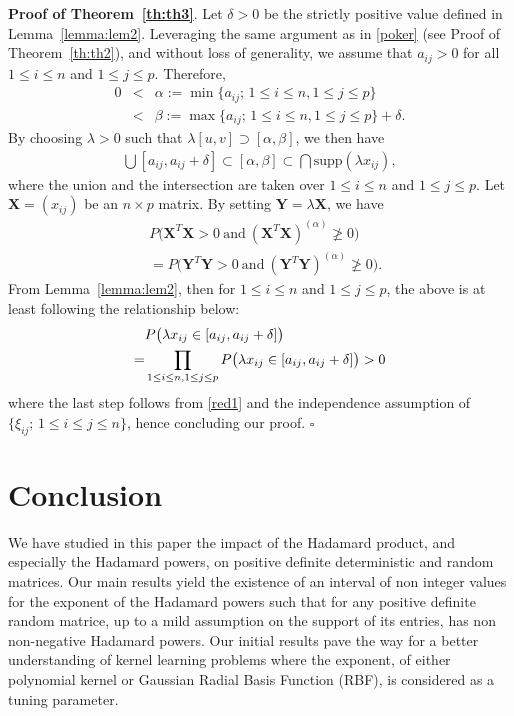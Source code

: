 \documentclass[conference,letterpaper]{IEEEtran}
\numberwithin{equation}{section}
\newcommand{\lbl}{\label}
\newcommand{\beaa}{\begin{eqnarray*}}
\newcommand{\eeaa}{\end{eqnarray*}}
\newcommand{\bea}{\begin{eqnarray}}
\newcommand{\eea}{\end{eqnarray}}
\begin{document}
\noindent\textbf{Proof of Theorem~\ref{th:th3}}. Let $\delta >0$ be the strictly positive value defined in Lemma~\ref{lemma:lem2}. 
Leveraging the same argument as in \eqref{poker} (see Proof of Theorem~\ref{th:th2}), and without loss of generality, we assume that $a_{ij}>0$ for all $1\leq i\leq n$ and $1\leq j \leq p$. 
Therefore,
\beaa
0&<&\alpha:=\min\{a_{ij};\, 1\leq i \leq n, 1\leq j \leq p\}\\
&<& \beta:=\max\{a_{ij};\, 1\leq i\leq n, 1\leq j \leq p\}+\delta.
\eeaa
By choosing $\lambda>0$ such that $\lambda [u, v]\supset [\alpha , \beta]$, we then have
\bea\lbl{red1}
\bigcup [a_{ij}, a_{ij}+\delta] \subset [\alpha, \beta]\subset \bigcap   \mbox{supp}(\lambda x_{ij}),
\eea
where the union and the intersection are taken over $1\leq i \leq n$ and $1\leq j \leq p.$ 
Let $\mathbf{X}=(x_{ij})$ be an $n\times p $ matrix.
By setting $\mathbf{Y}=\lambda\mathbf{X}$, we have
\beaa
& P\big(\mathbf{X}^T\mathbf{X}>0\ \mbox{and}\ (\mathbf{X}^T\mathbf{X})^{(\alpha)}\ngeqslant 0\big)\\
& =  P\big(\mathbf{Y}^T\mathbf{Y}>0\ \mbox{and}\ (\mathbf{Y}^T\mathbf{Y})^{(\alpha)}\ngeqslant 0\big).
\eeaa
From Lemma~\ref{lemma:lem2}, then for $1\leq i\leq n$ and $1\leq j \leq p$, the above is at least following the relationship below:
\begin{align}\notag
& P\big(\lambda x_{ij}\in [a_{ij}, a_{ij}+\delta]\big)\\ \notag
=& \prod_{1\leq i\leq n, 1\leq j \leq p}P\big(\lambda x_{ij}\in [a_{ij}, a_{ij}+\delta]\big)>0\notag
\end{align}
where the last step follows from \eqref{red1} and the independence assumption of $\{\xi_{ij};\, 1\leq i \leq j \leq n\}$, hence concluding our proof. \hfill$\square$



\section{Conclusion}\lbl{sec:conclusion}

We have studied in this paper the impact of the Hadamard product, and especially the Hadamard powers, on positive definite deterministic and random matrices.
Our main results yield the existence of an interval of non integer values for the exponent of the Hadamard powers such that for any positive definite random matrice, up to a mild assumption on the support of its entries, has non non-negative Hadamard powers.
Our initial results pave the way for a better understanding of kernel learning problems where the exponent, of either polynomial kernel or Gaussian Radial Basis Function (RBF), is considered as a tuning parameter.
\end{document}

